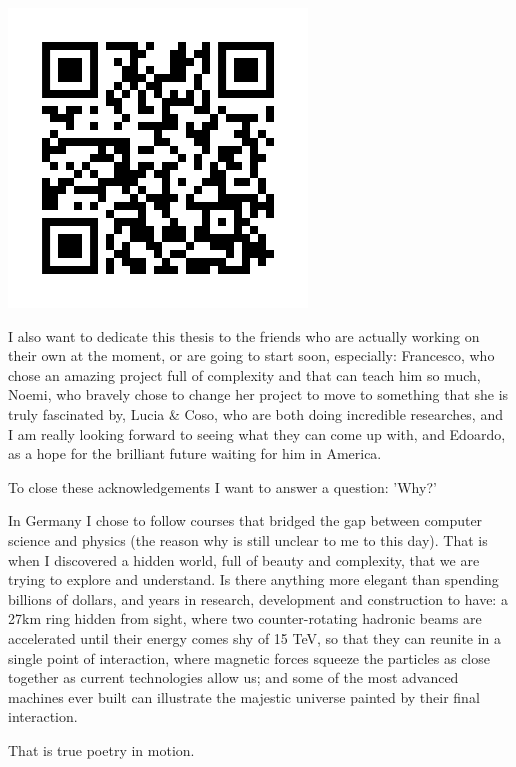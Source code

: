 \begin{minipage}{0.3\textwidth}
	\includegraphics[scale=0.4]{img/kek.png}
\end{minipage}%
\hfill
\begin{minipage}{0.65\textwidth}
	I also want to dedicate this thesis to the friends who are actually working on their own at the
	moment, or are going to start soon, especially: Francesco, who chose an amazing project full of
	complexity and that can teach him so much, Noemi, who bravely chose to change her project to move to
	something that she is truly fascinated by, Lucia \& Coso, who are both doing incredible
	researches, and I am really looking forward to seeing what they can come up with, and
	Edoardo, as a hope for the brilliant future waiting for him in America.
\end{minipage}

\bigskip

To close these acknowledgements I want to answer a question: 'Why?'

\medskip

In Germany I chose to follow courses that bridged the gap between computer science and physics (the
reason why is still unclear to me to this day). That is when I discovered a hidden world, full of
beauty and complexity, that we are trying to explore and understand. Is there anything more elegant
than spending billions of dollars, and years in research, development and construction to have: a
27km ring hidden from sight, where two counter-rotating hadronic beams are accelerated until their
energy comes shy of 15 TeV, so that they can reunite in a single point of interaction, where
magnetic forces squeeze the particles as close together as current technologies allow us; and some
of the most advanced machines ever built can illustrate the majestic universe painted by their final
interaction.

\bigskip

That is true poetry in motion.
